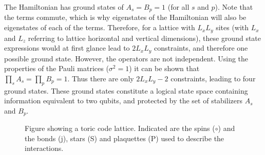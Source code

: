 The Hamiltonian has ground states of $A_s=B_p=1$ (for all $s$ and $p$). Note that the terms commute, which is why eigenstates of the Hamiltonian will also be eigenstates of each of the terms. Therefore, for a lattice with $L_xL_y$ sites (with $L_x$ and $L_z$ referring to lattice horizontal and vertical dimensions), these ground state expressions would at first glance lead to $2L_xL_y$ constraints, and therefore one possible ground state. However, the operators are not independent. Using the properties of the Pauli matrices ($\sigma^2=1$) it can be shown that $\prod_{s}A_s=\prod_{p}B_p=1$. Thus there are only $2L_xL_y-2$ constraints, leading to four ground states. These ground states constitute a logical state space containing information equivalent to two qubits, and protected by the set of stabilizers $A_s$ and $B_p$.

\begin{figure}
    \centering

    \caption[Figure showing a toric code lattice]{Figure showing a toric code lattice. Indicated are the spins (\textcolor{NavyBlue}{$\circ$}) and the bonds (j), stars (S) and plaquettes (P) used to describe the interactions.}
    \label{fig:toric_code}
\end{figure}

